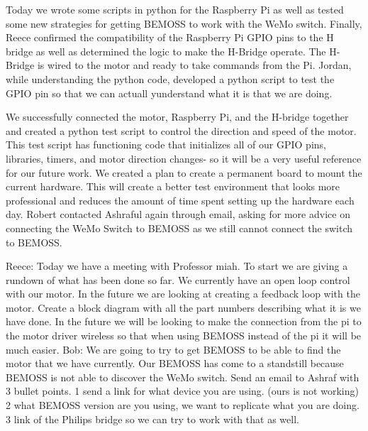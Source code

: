 \documentclass[fontsize=11pt, %
                             paper=letter, %
                             twoside, %
                             captions=tableheading,
                             index=totoc,
                             hyperref]{labbook}
\begin{document}
Today we wrote some scripts in python for the Raspberry Pi as well as tested some new strategies for getting BEMOSS to work with the WeMo switch. Finally, Reece confirmed the compatibility of the Raspberry Pi GPIO pins to the H bridge as well as determined the logic to make the H-Bridge operate. The H-Bridge is wired to the motor and ready to take commands from the Pi.
Jordan, while understanding the python code, developed a python script to test the GPIO pin so that we can actuall yunderstand what it is that we are doing.

We successfully connected the motor, Raspberry Pi, and the H-bridge together and created a python test script to control the direction and speed of the motor. This test script has functioning code that initializes all of our GPIO pins, libraries, timers, and motor direction changes- so it will be a very useful reference for our future work. We created a plan to create a permanent board to mount the current hardware. This will create a better test environment that looks more professional and reduces the amount of time spent setting up the hardware each day. Robert contacted Ashraful again through email, asking for more advice on connecting the WeMo Switch to BEMOSS as we still cannot connect the switch to BEMOSS.

Reece: Today we have a meeting with Professor miah. To start we are giving a rundown of what has been done so far. We currently have an open loop control with our motor. In the future we are looking at creating a feedback loop with the motor. Create a block diagram with all the part numbers describing what it is we have done. In the future we will be looking to make the connection from the pi to the motor driver wireless so that when using BEMOSS instead of the pi it will be much easier.
\newline Bob: We are going to try to get BEMOSS to be able to find the motor that we have currently. Our BEMOSS has come to a standstill because BEMOSS is not able to discover the WeMo switch. Send an email to Ashraf with 3 bullet points. 1 send a link for what device you are using. (ours is not working) 2 what BEMOSS version are you using, we want to replicate what you are doing. 3 link of the Philips bridge so we can try to work with that as well. 
\end{document}
